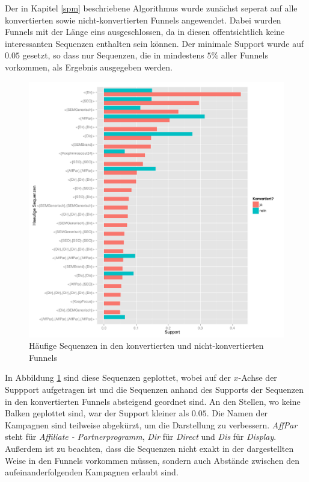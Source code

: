 Der in Kapitel \ref{spm} beschriebene Algorithmus wurde zunächst seperat auf alle konvertierten sowie nicht-konvertierten Funnels angewendet. Dabei wurden Funnels mit der Länge eins ausgeschlossen, da in diesen offentsichtlich keine interessanten Sequenzen enthalten sein können. Der minimale Support wurde auf $0.05$ gesetzt, so dass nur Sequenzen, die in mindestens $5 \%$ aller Funnels vorkommen, als Ergebnis ausgegeben werden.
\begin{figure}[H]
	\centering\includegraphics[scale=0.6]{spm_all.pdf}\caption[Häufige Sequenzen]{Häufige Sequenzen in den konvertierten und nicht-konvertierten Funnels}\label{spm_all}
\end{figure}
\noindent In Abbildung \ref{spm_all} sind diese Sequenzen geplottet, wobei auf der $x$-Achse der Suppport aufgetragen ist und die Sequenzen anhand des Supports der Sequenzen in den konvertierten Funnels absteigend geordnet sind. An den Stellen, wo keine Balken geplottet sind, war der Support kleiner als $0.05$. Die Namen der Kampagnen sind teilweise abgekürzt, um die Darstellung zu verbessern. \textit{AffPar} steht für \textit{Affiliate - Partnerprogramm}, \textit{Dir} für \textit{Direct} und \textit{Dis} für \textit{Display}. Außerdem ist zu beachten, dass die Sequenzen nicht exakt in der dargestellten Weise in den Funnels vorkommen müssen, sondern auch Abstände zwischen den aufeinanderfolgenden Kampagnen erlaubt sind.
